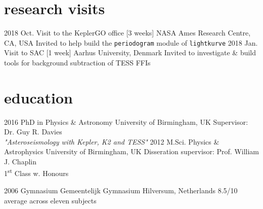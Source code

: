 \documentclass[]{k-cv} %
\begin{document}
\section{research visits}
\begin{entrylist}
\entry
{2018 Oct.}
{Visit to the KeplerGO office [3 weeks]}
{NASA Ames Research Centre, CA, USA}
{Invited to help build the \texttt{periodogram} module of \texttt{lightkurve}}
\entry
{2018 Jan.}
{Visit to SAC [1 week]}
{Aarhus University, Denmark}
{Invited to investigate \& build tools for background subtraction of TESS FFIs}
\end{entrylist}

\clearpage
{}


\section{education}

\begin{entrylist}
\entry
{2016 }
{PhD {\normalfont in Physics \& Astronomy}}
{University of Birmingham, UK}
{Supervisor: Dr. Guy R. Davies\\
\emph{"Asteroseismology with \textit{Kepler}, K2 and TESS"} \vspace{0.2cm}}
\entry
{2012 }
{M.Sci. {\normalfont Physics \& Astrophysics}}
{University of Birmingham, UK}
{Disseration supervisor: Prof. William J. Chaplin\\
1\textsuperscript{st} Class w. Honours\vspace{0.2cm}}


\entry
{2006 }
{Gymnasium}
{Gemeentelijk Gymnasium Hilversum, Netherlands}
{8.5/10 average across eleven subjects}
\end{entrylist}
\end{document}
